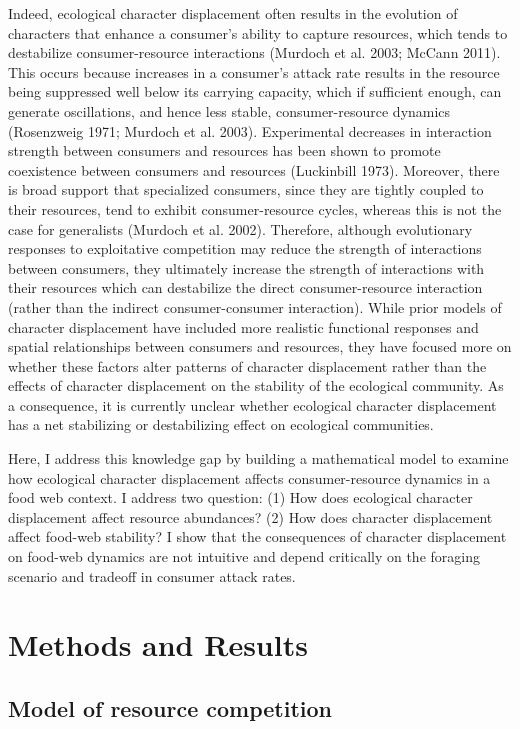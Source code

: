 \documentclass[11pt,]{article}
\begin{document}
Indeed, ecological character displacement often results in the evolution
of characters that enhance a consumer's ability to capture resources,
which tends to destabilize consumer-resource interactions (Murdoch et
al. 2003; McCann 2011). This occurs because increases in a consumer's
attack rate results in the resource being suppressed well below its
carrying capacity, which if sufficient enough, can generate
oscillations, and hence less stable, consumer-resource dynamics
(Rosenzweig 1971; Murdoch et al. 2003). Experimental decreases in
interaction strength between consumers and resources has been shown to
promote coexistence between consumers and resources (Luckinbill 1973).
Moreover, there is broad support that specialized consumers, since they
are tightly coupled to their resources, tend to exhibit
consumer-resource cycles, whereas this is not the case for generalists
(Murdoch et al. 2002). Therefore, although evolutionary responses to
exploitative competition may reduce the strength of interactions between
consumers, they ultimately increase the strength of interactions with
their resources which can destabilize the direct consumer-resource
interaction (rather than the indirect consumer-consumer interaction).
While prior models of character displacement have included more
realistic functional responses and spatial relationships between
consumers and resources, they have focused more on whether these factors
alter patterns of character displacement rather than the effects of
character displacement on the stability of the ecological community. As
a consequence, it is currently unclear whether ecological character
displacement has a net stabilizing or destabilizing effect on ecological
communities.

Here, I address this knowledge gap by building a mathematical model to
examine how ecological character displacement affects consumer-resource
dynamics in a food web context. I address two question: (1) How does
ecological character displacement affect resource abundances? (2) How
does character displacement affect food-web stability? I show that the
consequences of character displacement on food-web dynamics are not
intuitive and depend critically on the foraging scenario and tradeoff in
consumer attack rates.

\section{Methods and Results}\label{methods-and-results}

\subsection{Model of resource
competition}\label{model-of-resource-competition}
\end{document}
